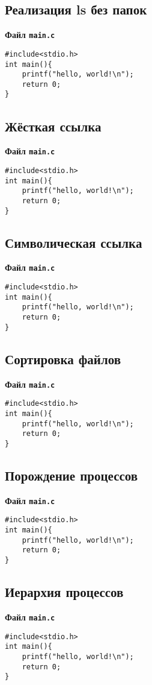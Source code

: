\documentclass[a4paper,14pt]{extarticle}
\begin{document}
\subsection{Реализация ls без папок}\label{code:ls-cat}
\centerline{\textbf{Файл \texttt{main.c}}}
\begin{verbatim}
#include<stdio.h>
int main(){	
	printf("hello, world!\n");
	return 0;
}
\end{verbatim}
\hrulefill

\subsection{Жёсткая ссылка}\label{code:hardlink}
\centerline{\textbf{Файл \texttt{main.c}}}
\begin{verbatim}
#include<stdio.h>
int main(){	
	printf("hello, world!\n");
	return 0;
}
\end{verbatim}
\hrulefill

\subsection{Символическая ссылка}\label{code:symlink}
\centerline{\textbf{Файл \texttt{main.c}}}
\begin{verbatim}
#include<stdio.h>
int main(){	
	printf("hello, world!\n");
	return 0;
}
\end{verbatim}
\hrulefill

\subsection{Сортировка файлов}\label{code:sort}
\centerline{\textbf{Файл \texttt{main.c}}}
\begin{verbatim}
#include<stdio.h>
int main(){	
	printf("hello, world!\n");
	return 0;
}
\end{verbatim}
\hrulefill

\subsection{Порождение процессов}\label{code:process}
\centerline{\textbf{Файл \texttt{main.c}}}
\begin{verbatim}
#include<stdio.h>
int main(){	
	printf("hello, world!\n");
	return 0;
}
\end{verbatim}
\hrulefill

\subsection{Иерархия процессов}\label{code:hierarchy}
\centerline{\textbf{Файл \texttt{main.c}}}
\begin{verbatim}
#include<stdio.h>
int main(){	
	printf("hello, world!\n");
	return 0;
}
\end{verbatim}
\hrulefill
\end{document}
